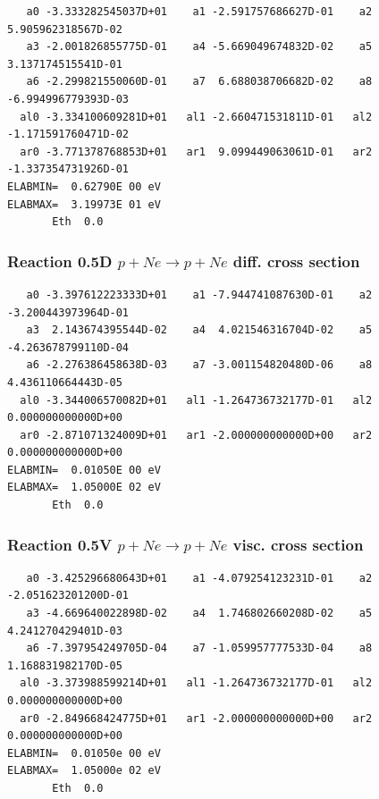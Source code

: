 \documentclass[12pt,dvipdfmx]{article}
\begin{document}
\begin{small}\begin{verbatim}
   a0 -3.333282545037D+01    a1 -2.591757686627D-01    a2  5.905962318567D-02
   a3 -2.001826855775D-01    a4 -5.669049674832D-02    a5  3.137174515541D-01
   a6 -2.299821550060D-01    a7  6.688038706682D-02    a8 -6.994996779393D-03
  al0 -3.334100609281D+01   al1 -2.660471531811D-01   al2 -1.171591760471D-02
  ar0 -3.771378768853D+01   ar1  9.099449063061D-01   ar2 -1.337354731926D-01
ELABMIN=  0.62790E 00 eV
ELABMAX=  3.19973E 01 eV
       Eth  0.0
\end{verbatim}\end{small}

\subsubsection{
Reaction 0.5D    $p + Ne \rightarrow p + Ne  $ diff. cross
section }


\begin{small}\begin{verbatim}
   a0 -3.397612223333D+01    a1 -7.944741087630D-01    a2 -3.200443973964D-01
   a3  2.143674395544D-02    a4  4.021546316704D-02    a5 -4.263678799110D-04
   a6 -2.276386458638D-03    a7 -3.001154820480D-06    a8  4.436110664443D-05
  al0 -3.344006570082D+01   al1 -1.264736732177D-01   al2  0.000000000000D+00
  ar0 -2.871071324009D+01   ar1 -2.000000000000D+00   ar2  0.000000000000D+00
ELABMIN=  0.01050E 00 eV
ELABMAX=  1.05000E 02 eV
       Eth  0.0
\end{verbatim}\end{small}


\subsubsection{
Reaction 0.5V   $ p + Ne \rightarrow p + Ne  $ visc. cross
section }


\begin{small}\begin{verbatim}
   a0 -3.425296680643D+01    a1 -4.079254123231D-01    a2 -2.051623201200D-01
   a3 -4.669640022898D-02    a4  1.746802660208D-02    a5  4.241270429401D-03
   a6 -7.397954249705D-04    a7 -1.059957777533D-04    a8  1.168831982170D-05
  al0 -3.373988599214D+01   al1 -1.264736732177D-01   al2  0.000000000000D+00
  ar0 -2.849668424775D+01   ar1 -2.000000000000D+00   ar2  0.000000000000D+00
ELABMIN=  0.01050e 00 eV
ELABMAX=  1.05000e 02 eV
       Eth  0.0
\end{verbatim}\end{small}
\end{document}
